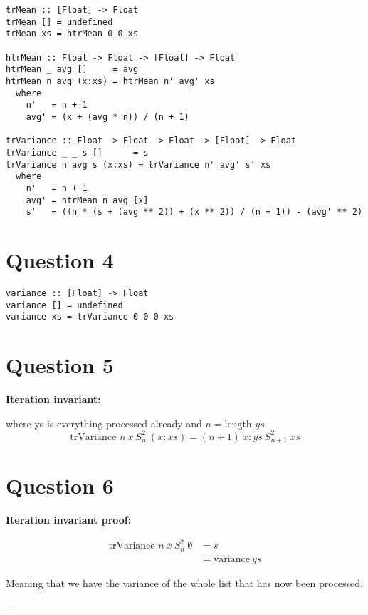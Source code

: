\documentclass{article}
\begin{document}
\begin{verbatim}
trMean :: [Float] -> Float
trMean [] = undefined
trMean xs = htrMean 0 0 xs

htrMean :: Float -> Float -> [Float] -> Float
htrMean _ avg []     = avg
htrMean n avg (x:xs) = htrMean n' avg' xs
  where
    n'   = n + 1
    avg' = (x + (avg * n)) / (n + 1)

trVariance :: Float -> Float -> Float -> [Float] -> Float
trVariance _ _ s []      = s
trVariance n avg s (x:xs) = trVariance n' avg' s' xs
  where
    n'   = n + 1
    avg' = htrMean n avg [x]
    s'   = ((n * (s + (avg ** 2)) + (x ** 2)) / (n + 1)) - (avg' ** 2)
\end{verbatim}

\section{Question 4}

\begin{verbatim}
variance :: [Float] -> Float
variance [] = undefined
variance xs = trVariance 0 0 0 xs
\end{verbatim}

\clearpage

\section{Question 5}

\textbf{Iteration invariant:}

where ys is everything processed already and $n = \text{length } ys$
$$
\text{trVariance } n \ \overline{x} \ S^2_n \ (x:xs) = (n + 1) \ \overline{x:ys} \ S^2_{n + 1} \ xs
$$

\section{Question 6}

\textbf{Iteration invariant proof:}

$$\begin{aligned}
\text{trVariance } n \ \overline{x} \ S^2_n \ \emptyset & = s\\
& = \text{variance} \ ys
\end{aligned}$$

Meaning that we have the variance of the whole list that has now been processed.

---
\end{document}
